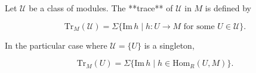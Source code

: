 Let $\mathcal{U}$ be a class of modules. The **trace** of $\mathcal{U}$ in $M$ is defined by

$$\mathrm{Tr}_M(\mathcal{U}) = \Sigma \{ \mathrm{Im}\, h \mid h: U \rightarrow M \text{ for some } U \in \mathcal{U} \}.$$

In the particular case where $\mathcal{U} = \{U\}$ is a singleton,

$$\mathrm{Tr}_M(U) = \Sigma \{ \mathrm{Im}\, h \mid h \in \mathrm{Hom}_R(U, M) \}.$$
